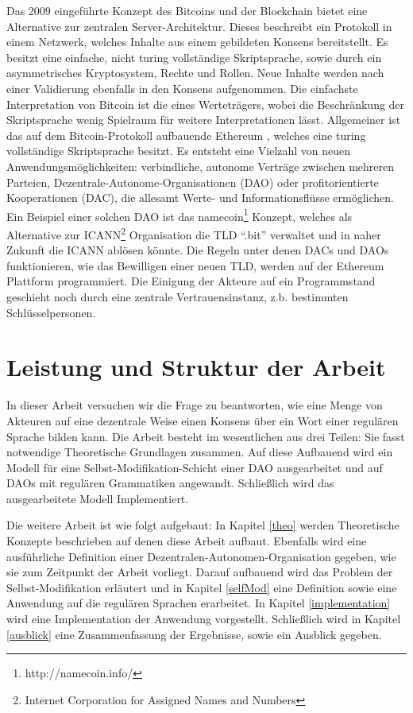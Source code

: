 \documentclass[a4paper,12pt]{report}
\begin{document}
Das 2009 eingeführte Konzept des Bitcoins und der Blockchain\cite{Nakamoto2008} bietet eine Alternative zur zentralen Server-Architektur. Dieses beschreibt ein Protokoll in einem Netzwerk, welches Inhalte aus einem gebildeten Konsens bereitstellt. Es besitzt eine einfache, nicht turing vollständige Skriptsprache, sowie durch ein asymmetrisches Kryptosystem, Rechte und Rollen. Neue Inhalte werden nach einer Validierung ebenfalls in den Konsens aufgenommen. Die einfachste Interpretation von Bitcoin ist die eines Werteträgers, wobei die Beschränkung der Skriptsprache wenig Spielraum für weitere Interpretationen lässt.
Allgemeiner ist das auf dem Bitcoin-Protokoll aufbauende Ethereum\cite{Wood2014} , welches eine turing vollständige Skriptsprache besitzt.
Es entsteht eine Vielzahl von neuen Anwendungsmöglichkeiten: verbindliche, autonome Verträge zwischen mehreren Parteien, Dezentrale-Autonome-Organisationen (DAO) oder profitorientierte Kooperationen (DAC), die allesamt Werte- und Informationsflüsse ermöglichen.
Ein Beispiel einer solchen DAO ist das namecoin\footnote{http://namecoin.info/} Konzept, welches als Alternative zur ICANN\footnote{Internet Corporation for Assigned Names and Numbers} Organisation die TLD ``.bit'' verwaltet und in naher Zukunft die ICANN ablösen könnte.\cite{Corporation2014} Die Regeln unter denen DACs und DAOs funktionieren, wie das Bewilligen einer neuen TLD, werden auf der Ethereum Plattform programmiert.
Die Einigung der Akteure auf ein Programmstand geschieht noch durch eine zentrale Vertrauensinstanz, z.b. bestimmten Schlüsselpersonen.


\section*{Leistung und Struktur der Arbeit}
In dieser Arbeit versuchen wir die Frage zu beantworten, wie eine Menge von Akteuren auf eine dezentrale Weise einen Konsens über ein Wort einer regulären Sprache bilden kann.
Die Arbeit besteht im wesentlichen aus drei Teilen: Sie fasst notwendige Theoretische Grundlagen zusammen. Auf diese Aufbauend wird ein Modell für eine Selbst-Modifikation-Schicht einer DAO ausgearbeitet und auf DAOs mit regulären Grammatiken angewandt. Schließlich wird das ausgearbeitete Modell Implementiert.

Die weitere Arbeit ist wie folgt aufgebaut: In Kapitel \ref{theo} werden Theoretische Konzepte beschrieben auf denen diese Arbeit aufbaut. Ebenfalls wird eine ausführliche Definition einer Dezentralen-Autonomen-Organisation gegeben, wie sie zum Zeitpunkt der Arbeit vorliegt. Darauf aufbauend wird das Problem der Selbst-Modifikation erläutert und in Kapitel \ref{selfMod} eine Definition sowie eine Anwendung auf die regulären Sprachen erarbeitet. In Kapitel \ref{implementation} wird eine Implementation der Anwendung vorgestellt. Schließlich wird in Kapitel \ref{ausblick} eine Zusammenfassung der Ergebnisse, sowie ein Ausblick gegeben. 
\end{document}
